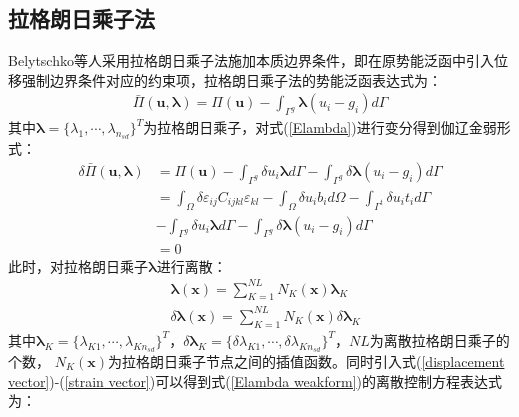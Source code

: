 \subsection{拉格朗日乘子法}
Belytschko等人采用拉格朗日乘子法施加本质边界条件，即在原势能泛函中引入位移强制边界条件对应的约束项，拉格朗日乘子法的势能泛函表达式为：
\begin{equation}\label{Elambda}
\begin{split}
    \bar{\Pi}(\pmb{u},\pmb{\lambda})=\Pi(\pmb{u})-\int_{\Gamma^g}\pmb{\lambda}(u_i-g_i)d\Gamma
\end{split}
\end{equation}   
其中$\pmb{\lambda}=\{\lambda_1,\dotsb,\lambda_{n_{sd}}\}^T$为拉格朗日乘子，对式(\ref{Elambda})进行变分得到伽辽金弱形式：
\begin{equation}\label{Elambda weakform}
\begin{split}
        \delta\bar{\Pi}(\pmb{u},\pmb{\lambda})&=\Pi(\pmb{u})-\int_{\Gamma^g}\delta u_i\pmb{\lambda}d\Gamma-\int_{\Gamma^g}\delta\pmb{\lambda}(u_i-g_i)d\Gamma\\
       &=\int_{\Omega}\delta\varepsilon_{ij}C_{ijkl}\varepsilon_{kl}-\int_{\Omega}\delta u_ib_id\Omega-\int_{\Gamma^t}\delta u_it_id\Gamma\\
       &-\int_{\Gamma^g}\delta u_i\pmb{\lambda}d\Gamma-\int_{\Gamma^g}\delta\pmb{\lambda}(u_i-g_i)d\Gamma\\
       &=0
\end{split}
\end{equation} 
此时，对拉格朗日乘子$\pmb{\lambda}$进行离散：
\begin{equation}
\begin{split}
    &\pmb{\lambda}(\pmb{x})=\sum_{K=1}^{N\!L}N_K(\pmb{x})\pmb \lambda_K\\
&\delta\pmb{\lambda}(\pmb{x})=\sum_{K=1}^{N\!L}N_K(\pmb{x})\delta\pmb \lambda_K
\end{split}
\end{equation}
其中$\pmb \lambda_K=\{\lambda_{K1},\dotsb,\lambda_{Kn_{sd}}\}^T$，$\delta\pmb \lambda_K=\{\delta\lambda_{K1},\dotsb,\delta\lambda_{Kn_{sd}}\}^T$，$NL$为离散拉格朗日乘子的个数，
$N_K(\pmb{x})$为拉格朗日乘子节点之间的插值函数。同时引入式(\ref{displacement vector})-(\ref{strain vector})可以得到式(\ref{Elambda weakform})的离散控制方程表达式为：
